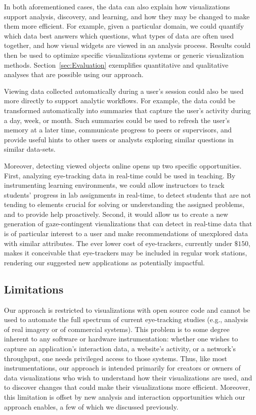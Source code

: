 In both aforementioned cases, the data can also explain how visualizations support analysis, discovery, and learning, and how they may be changed to make them more efficient. For example, given a particular domain, we could quantify which data best answers which questions, what types of data are often used together, and how visual widgets are viewed in an analysis process. Results could then be used to optimize specific visualizations systems or generic visualization methods.  Section~\ref{sec:Evaluation} exemplifies quantitative and qualitative analyses that are possible using our approach.   

Viewing data collected automatically during a user's session could also be used more directly to support analytic workflows. For example, the data could be transformed automatically into summaries that capture the user's activity during a day, week, or month. Such summaries could be used to refresh the user's memory at a later time, communicate progress to peers or supervisors, and provide useful hints to other users or analysts exploring similar questions in similar data-sets.

Moreover, detecting viewed objects online opens up two specific opportunities. First, analyzing eye-tracking data in real-time could be used in teaching. By instrumenting learning environments, we could allow instructors to track students' progress in lab assignments in real-time, to detect students that are not tending to elements crucial for solving or understanding the assigned problems, and to provide help proactively. Second, it would allow us to create a new generation of gaze-contingent visualizations that can detect in real-time data that is of particular interest to a user and make recommendations of unexplored data with similar attributes. The ever lower cost of eye-trackers, currently under $\$150$, makes it conceivable that eye-trackers may be included in regular work stations, rendering our suggested new applications as potentially impactful. 


\subsection{Limitations}
\label{sec:Limitations}
Our approach is restricted to visualizations with open source code and cannot be used to automate the full spectrum of current eye-tracking studies (e.g., analysis of real imagery or of commercial systems).   This problem is to some degree inherent to any software or hardware instrumentation: whether one wishes to capture an application's interaction data, a website's activity, or a network's throughput, one needs privileged access to those systems. Thus, like most instrumentations, our approach is intended primarily for creators or owners of data visualizations who wish to understand how their visualizations are used, and to discover changes that could make their visualizations more efficient. Moreover, this limitation is offset by new analysis and interaction opportunities which our approach enables, a few of which we discussed previously.  

